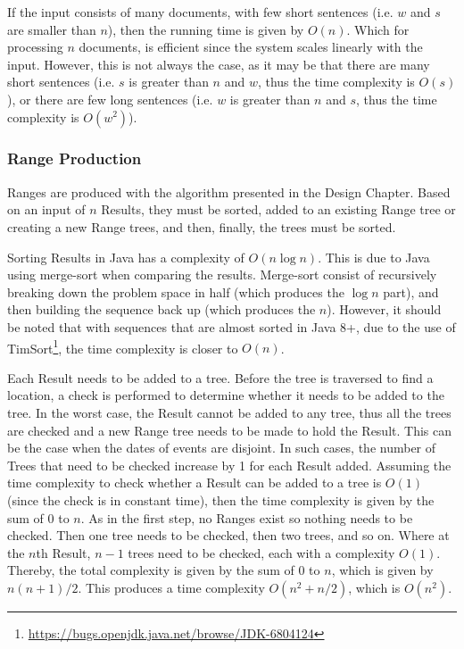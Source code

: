 \par If the input consists of many documents, with few short sentences (i.e. $w$ and $s$ are smaller than $n$), then the running time is given by $O(n)$. Which for processing $n$ documents, is efficient since the system scales linearly with the input. However, this is not always the case, as it may be that there are many short sentences (i.e. $s$ is greater than $n$ and $w$, thus the time complexity is $O(s)$), or there are few long sentences (i.e. $w$ is greater than $n$ and $s$, thus the time complexity is $O(w^2)$).

\subsubsection{Range Production}
\par Ranges are produced with the algorithm presented in the Design Chapter. Based on an input of $n$ Results, they must be sorted, added to an existing Range tree or creating a new Range trees, and then, finally, the trees must be sorted.

\par Sorting Results in Java has a complexity of $O(n\log n)$. This is due to Java using merge-sort when comparing the results. Merge-sort consist of recursively breaking down the problem space in half (which produces the $\log n$ part), and then building the sequence back up (which produces the $n$). However, it should be noted that with sequences that are almost sorted in Java 8+, due to the use of TimSort\footnote{\url{https://bugs.openjdk.java.net/browse/JDK-6804124}}, the time complexity is closer to $O(n)$. 

\par Each Result needs to be added to a tree. Before the tree is traversed to find a location, a check is performed to determine whether it needs to be added to the tree. In the worst case, the Result cannot be added to any tree, thus all the trees are checked and a new Range tree needs to be made to hold the Result. This can be the case when the dates of events are disjoint.  In such cases, the number of Trees that need to be checked increase by 1 for each Result added. Assuming the time complexity to check whether a Result can be added to a tree is $O(1)$ (since the check is in constant time), then the time complexity is given by the sum of 0 to $n$. As in the first step, no Ranges exist so nothing needs to be checked. Then one tree needs to be checked, then two trees, and so on. Where at the $n$th Result, $n-1$ trees need to be checked, each with a complexity $O(1)$. Thereby, the total complexity is given by the sum of 0 to $n$, which is given by ${n(n+1)}/2$. This produces a time complexity $O({n^2+n}/2)$, which is $O(n^2)$.

